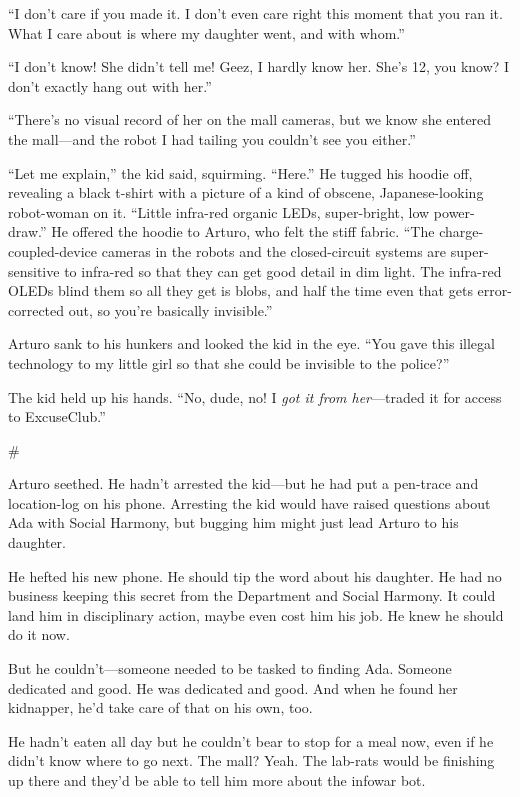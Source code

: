 “I don’t care if you made it. I don’t even care right this moment
that you ran it. What I care about is where my daughter went, and
with whom.”

“I don’t know! She didn’t tell me! Geez, I hardly know her. She’s
12, you know? I don’t exactly hang out with her.”

“There’s no visual record of her on the mall cameras, but we know
she entered the mall—and the robot I had tailing you couldn’t see
you either.”

“Let me explain,” the kid said, squirming. “Here.” He tugged his
hoodie off, revealing a black t-shirt with a picture of a kind of
obscene, Japanese-looking robot-woman on it. “Little infra-red
organic LEDs, super-bright, low power-draw.” He offered the hoodie
to Arturo, who felt the stiff fabric. “The charge-coupled-device
cameras in the robots and the closed-circuit systems are
super-sensitive to infra-red so that they can get good detail in
dim light. The infra-red OLEDs blind them so all they get is blobs,
and half the time even that gets error-corrected out, so you’re
basically invisible.”

Arturo sank to his hunkers and looked the kid in the eye. “You gave
this illegal technology to my little girl so that she could be
invisible to the police?”

The kid held up his hands. “No, dude, no! I
\emph{got it from her}—traded it for access to ExcuseClub.”

\#

Arturo seethed. He hadn’t arrested the kid—but he had put a
pen-trace and location-log on his phone. Arresting the kid would
have raised questions about Ada with Social Harmony, but bugging
him might just lead Arturo to his daughter.

He hefted his new phone. He should tip the word about his daughter.
He had no business keeping this secret from the Department and
Social Harmony. It could land him in disciplinary action, maybe
even cost him his job. He knew he should do it now.

But he couldn’t—someone needed to be tasked to finding Ada. Someone
dedicated and good. He was dedicated and good. And when he found
her kidnapper, he’d take care of that on his own, too.

He hadn’t eaten all day but he couldn’t bear to stop for a meal
now, even if he didn’t know where to go next. The mall? Yeah. The
lab-rats would be finishing up there and they’d be able to tell him
more about the infowar bot.

